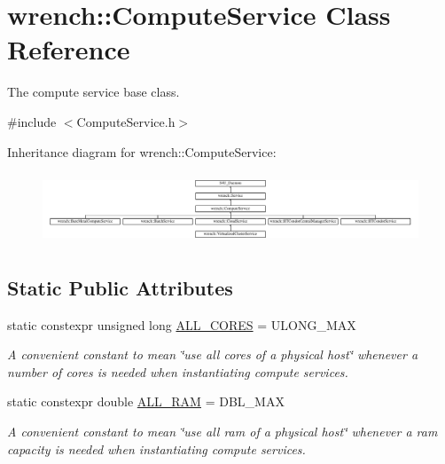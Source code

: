 \hypertarget{classwrench_1_1_compute_service}{}\section{wrench\+:\+:Compute\+Service Class Reference}
\label{classwrench_1_1_compute_service}


The compute service base class.  




{\ttfamily \#include $<$Compute\+Service.\+h$>$}

Inheritance diagram for wrench\+:\+:Compute\+Service\+:\begin{figure}[H]
\begin{center}
\leavevmode
\includegraphics[height=2.137404cm]{classwrench_1_1_compute_service}
\end{center}
\end{figure}
\subsection*{Static Public Attributes}
\begin{DoxyCompactItemize}
\item 
\mbox{\label{classwrench_1_1_compute_service_a1160f521623440ad4e0e0823e08a7d22}} 
static constexpr unsigned long \hyperlink{classwrench_1_1_compute_service_a1160f521623440ad4e0e0823e08a7d22}{A\+L\+L\+\_\+\+C\+O\+R\+ES} = U\+L\+O\+N\+G\+\_\+\+M\+AX
\begin{DoxyCompactList}\small\item\em A convenient constant to mean \char`\"{}use all cores of a physical host\char`\"{} whenever a number of cores is needed when instantiating compute services. \end{DoxyCompactList}\item 
\mbox{\label{classwrench_1_1_compute_service_abc4fe0bad59f544b4b34d0e7d4012d44}} 
static constexpr double \hyperlink{classwrench_1_1_compute_service_abc4fe0bad59f544b4b34d0e7d4012d44}{A\+L\+L\+\_\+\+R\+AM} = D\+B\+L\+\_\+\+M\+AX
\begin{DoxyCompactList}\small\item\em A convenient constant to mean \char`\"{}use all ram of a physical host\char`\"{} whenever a ram capacity is needed when instantiating compute services. \end{DoxyCompactList}\end{DoxyCompactItemize}


